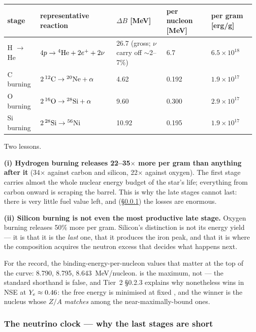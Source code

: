 \begingroup\small
\begin{tabularx}{\textwidth}{@{}L{1.7cm} Y L{2.6cm} L{2.0cm} L{2.2cm}@{}}
\toprule
\textbf{stage} & \textbf{representative reaction} & \textbf{$\Delta B$ [MeV]} &
  \textbf{per nucleon [MeV]} & \textbf{per gram [erg/g]} \\
\midrule
H $\to$ He & $4p \to \nuc{He}{4} + 2e^+ + 2\nu$ &
  26.7 (gross; $\nu$ carry off ${\sim}$2--7\%) & 6.7 & $6.5 \times 10^{18}$ \\
C burning & $2\,\nuc{C}{12} \to \nuc{Ne}{20} + \alpha$ & 4.62 & 0.192 &
  $1.9 \times 10^{17}$ \\
O burning & $2\,\nuc{O}{16} \to \nuc{Si}{28} + \alpha$ & 9.60 & 0.300 &
  $2.9 \times 10^{17}$ \\
Si burning & $2\,\nuc{Si}{28} \to \nuc{Ni}{56}$ & 10.92 & 0.195 &
  $1.9 \times 10^{17}$ \\
\bottomrule
\end{tabularx}
\endgroup

Two lessons.

\textbf{(i) Hydrogen burning releases 22--35$\times$ more per gram than anything
after it} (34$\times$ against carbon and silicon, 22$\times$ against oxygen).
The first stage carries almost the whole nuclear energy budget of the star's
life; everything from carbon onward is scraping the barrel. This is why the
late stages cannot last: there is very little fuel value left, and
(\S\ref{sec:neutrinoclock}) the losses are enormous.

\textbf{(ii) Silicon burning is not even the most productive late stage.} Oxygen
burning releases 50\% more per gram. Silicon's distinction is not its energy
yield --- it is that it is the \emph{last} one, that it produces the iron peak,
and that it is where the composition acquires the neutron excess that decides
what happens next.

For the record, the binding-energy-per-nucleon values that matter at the top of
the curve:  8.790,  8.795, 
8.643~MeV/nucleon. 
 is the maximum, not  \citep{fewell1995} --- the
standard shorthand is false, and Tier~2 \S0.2.3 explains why 
nonetheless wins in NSE at $\Ye \approx 0.46$: the free energy is minimised at
fixed \Ye, and the winner is the nucleus whose $Z/A$ \emph{matches} \Ye{} among
the near-maximally-bound ones.

\subsubsection{The neutrino clock --- why the last stages are short}
\label{sec:neutrinoclock}

